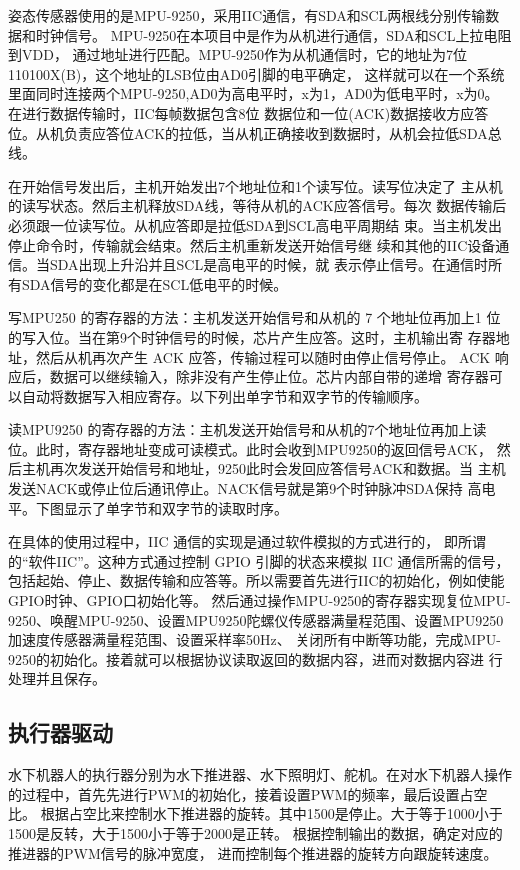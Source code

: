 姿态传感器使用的是MPU-9250，采用IIC通信，有SDA和SCL两根线分别传输数据和时钟信号。
MPU-9250在本项目中是作为从机进行通信，SDA和SCL上拉电阻到VDD，
通过地址进行匹配。MPU-9250作为从机通信时，它的地址为7位110100X(B)，这个地址的LSB位由AD0引脚的电平确定，
这样就可以在一个系统里面同时连接两个MPU-9250,AD0为高电平时，x为1，AD0为低电平时，x为0。在进行数据传输时，IIC每帧数据包含8位
数据位和一位(ACK)数据接收方应答位。从机负责应答位ACK的拉低，当从机正确接收到数据时，从机会拉低SDA总线。

在开始信号发出后，主机开始发出7个地址位和1个读写位。读写位决定了
主从机的读写状态。然后主机释放SDA线，等待从机的ACK应答信号。每次
数据传输后必须跟一位读写位。从机应答即是拉低SDA到SCL高电平周期结
束。当主机发出停止命令时，传输就会结束。然后主机重新发送开始信号继
续和其他的IIC设备通信。当SDA出现上升沿并且SCL是高电平的时候，就
表示停止信号。在通信时所有SDA信号的变化都是在SCL低电平的时候。

写MPU250 的寄存器的方法：主机发送开始信号和从机的 7 个地址位再加上1
位的写入位。当在第9个时钟信号的时候，芯片产生应答。这时，主机输出寄
存器地址，然后从机再次产生 ACK 应答，传输过程可以随时由停止信号停止。
ACK 响应后，数据可以继续输入，除非没有产生停止位。芯片内部自带的递增
寄存器可以自动将数据写入相应寄存。以下列出单字节和双字节的传输顺序。

读MPU9250 的寄存器的方法：主机发送开始信号和从机的7个地址位再加上读
位。此时，寄存器地址变成可读模式。此时会收到MPU9250的返回信号ACK，
然后主机再次发送开始信号和地址，9250此时会发回应答信号ACK和数据。当
主机发送NACK或停止位后通讯停止。NACK信号就是第9个时钟脉冲SDA保持
高电平。下图显示了单字节和双字节的读取时序。

在具体的使用过程中，IIC 通信的实现是通过软件模拟的方式进行的，
即所谓的“软件IIC”。这种方式通过控制 GPIO 引脚的状态来模拟 IIC 
通信所需的信号，包括起始、停止、数据传输和应答等。所以需要首先进行IIC的初始化，例如使能GPIO时钟、GPIO口初始化等。
然后通过操作MPU-9250的寄存器实现复位MPU-9250、唤醒MPU-9250、设置MPU9250陀螺仪传感器满量程范围、设置MPU9250加速度传感器满量程范围、设置采样率50Hz、
关闭所有中断等功能，完成MPU-9250的初始化。接着就可以根据协议读取返回的数据内容，进而对数据内容进
行处理并且保存。 

\subsection{执行器驱动 }
水下机器人的执行器分别为水下推进器、水下照明灯、舵机。在对水下机器人操作的过程中，首先先进行PWM的初始化，接着设置PWM的频率，最后设置占空比。
根据占空比来控制水下推进器的旋转。其中1500是停止。大于等于1000小于1500是反转，大于1500小于等于2000是正转。
根据控制输出的数据，确定对应的推进器的PWM信号的脉冲宽度，
进而控制每个推进器的旋转方向跟旋转速度。

